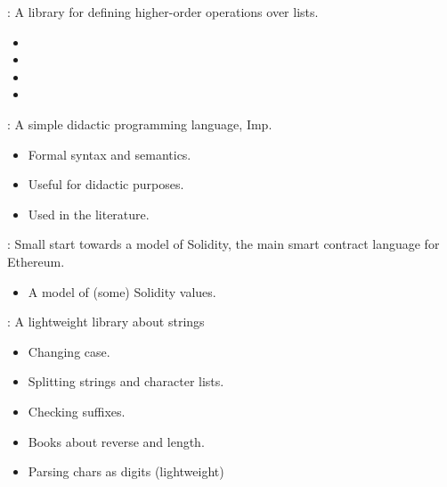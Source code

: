 
\begin{frame}

\newlibtitle

:
A library for defining higher-order operations over lists.
\begin{itemize}
\item {}
\item {}
\item {}
\item {}
\end{itemize}
\end{frame}


\begin{frame}

\newlibtitle

:
A simple didactic programming language, Imp.
\begin{itemize}
\item Formal syntax and semantics.
\item Useful for didactic purposes.
\item Used in the literature.
\end{itemize}

\end{frame}


\begin{frame}

\newlibtitle

:
Small start towards a model of Solidity,
the main smart contract language for Ethereum.
\begin{itemize}
\item A model of (some) Solidity values.
\end{itemize}

\end{frame}


\begin{frame}

\newlibtitle

:
A lightweight library about strings
\begin{itemize}
\item Changing case.
\item Splitting strings and character lists.
\item Checking suffixes.
\item Books about reverse and length.
\item Parsing chars as digits (lightweight)
\end{itemize}


\end{frame}

